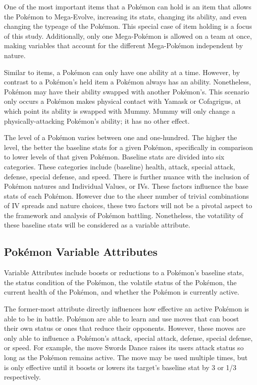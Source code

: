 \documentclass[12pt,twoside]{reedthesis}
\begin{document}
  One of the most important items that a Pokémon can hold is an item that
  allows the Pokémon to Mega-Evolve, increasing its stats, changing its
  ability, and even changing the typeage of the Pokémon. This special case
  of item holding is a focus of this study. Additionally, only one
  Mega-Pokémon is allowed on a team at once, making variables that account
  for the different Mega-Pokémon independent by nature.
  
  Similar to items, a Pokémon can only have one ability at a time.
  However, by contrast to a Pokémon's held item a Pokémon always has an
  ability. Nonetheless, Pokémon may have their ability swapped with
  another Pokémon's. This scenario only occurs a Pokémon makes physical
  contact with Yamask or Cofagrigus, at which point its ability is swapped
  with Mummy. Mummy will only change a physically-attacking Pokémon's
  ability; it has no other effect.
  
  The level of a Pokémon varies between one and one-hundred. The higher
  the level, the better the baseline stats for a given Pokémon,
  specifically in comparison to lower levels of that given Pokémon.
  Baseline stats are divided into six categories. These categories include
  (baseline) health, attack, special attack, defense, special defense, and
  speed. There is further nuance with the inclusion of Pokémon natures and
  Individual Values, or IVs. These factors influence the base stats of
  each Pokémon. However due to the sheer number of trivial combinations of
  IV spreads and nature choices, these two factors will not be a pivotal
  aspect to the framework and analysis of Pokémon battling. Nonetheless,
  the votatility of these baseline stats will be considered as a variable
  attribute.
  
  \subsection{Pokémon Variable
  Attributes}\label{pokemon-variable-attributes}
  
  Variable Attributes include boosts or reductions to a Pokémon's baseline
  stats, the status condition of the Pokémon, the volatile status of the
  Pokémon, the current health of the Pokémon, and whether the Pokémon is
  currently active.
  
  The former-most attribute directly influences how effective an active
  Pokémon is able to be in battle. Pokémon are able to learn and use moves
  that can boost their own status or ones that reduce their opponents.
  However, these moves are only able to influence a Pokémon's attack,
  special attack, defense, special defense, or speed. For example, the
  move Swords Dance raises its users attack status so long as the Pokémon
  remains active. The move may be used multiple times, but is only
  effective until it boosts or lowers its target's baseline stat by 3 or
  1/3 respectively.
  
\end{document}
